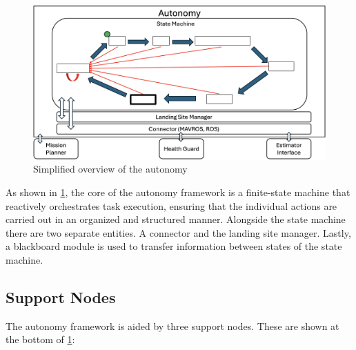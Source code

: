 \begin{figure}[ht!]
    \centering
    \includegraphics[scale=0.155]{images/system_overview/autonomy.png}
    \caption{Simplified overview of the autonomy}
    \label{fig:autonomy}
\end{figure}

As shown in \cref{fig:autonomy}, the core of the autonomy framework is a finite-state machine that reactively orchestrates task execution, ensuring that the individual actions are carried out in an organized and structured manner. Alongside the state machine there are two separate entities. A connector and the landing site manager. Lastly, a blackboard module is used to transfer information between states of the state machine.

\subsection{Support Nodes}

The autonomy framework is aided by three support nodes. These are shown at the bottom of \cref{fig:autonomy}:

